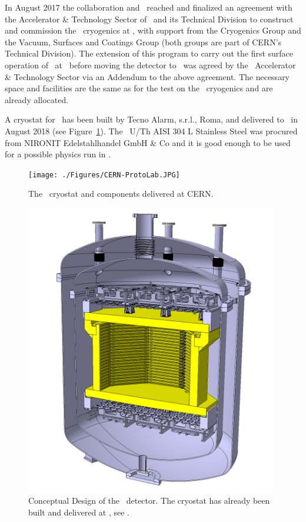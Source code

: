 In August 2017 the collaboration and \LNGS\ reached and finalized an agreement \cite{Mapelli:2017vn} with the Accelerator \& Technology Sector of \CERN\ and its Technical Division to construct and commission the \DSks\ cryogenics at \CERN, with support from the Cryogenics Group and the Vacuum, Surfaces and Coatings Group (both groups are part of CERN's Technical Division). The extension of this program to carry out the first surface operation of \DSps\ at \CERN\ before moving the detector to \LNGS\ was agreed by the \CERN\ Accelerator \& Technology Sector via an Addendum to the above agreement. The necessary space and facilities are the same as for the test on the \DSk\ cryogenics and are already allocated.

A cryostat for \DSps\ has been built by Tecno Alarm, s.r.l., Roma, and delivered to \CERN\ in August 2018 (see Figure~\ref{fig:proto-cern}).  The \DSlCryostatUCont\ U/Th AISI 304 L Stainless Steel was procured from NIRONIT Edelstahlhandel GmbH \& Co and it is good enough to be used for a possible physics run in \LNGS.

\begin{figure}[!t]
\centering
\texttt{[image: ./Figures/CERN-ProtoLab.JPG]}
\caption[The \DSps\ cryostat and components delivered at CERN]{The \DSps\ cryostat and components delivered at CERN.}
\label{fig:proto-cern}
\end{figure}

\begin{figure}[!t]
\centering
\includegraphics[width=0.98\textwidth]{./Figures/proto_1ton_newdesign_crop.png}
\caption[Conceptual design of the \DSps\ detector]{Conceptual Design of the \DSps\ detector.  The cryostat has already been built and delivered at \CERN, see .}
\label{fig:proto_1ton}
\end{figure}


